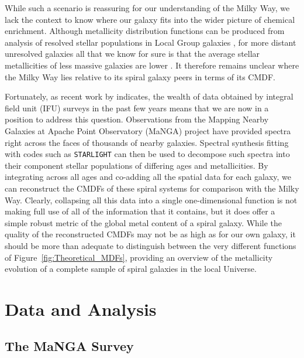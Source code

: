 \documentclass[fleqn,usenatbib]{mnras}
\begin{document}
While such a scenario is reassuring for our understanding of the Milky Way, we lack the context to know where our galaxy fits into the wider picture of chemical enrichment. Although metallicity distribution functions can be produced from analysis of resolved stellar populations in Local Group galaxies \citep[e.g.][]{Escala2018ModellingDiffusion, Manning2018FromGiants, Gilbert2019ElementalStream}, for more distant unresolved galaxies all that we know for sure is that the average stellar metallicities of less massive galaxies are lower \citep[e.g.][]{Gallazzi2005TheUniverse, Panter2008TheRecord}. It therefore remains unclear where the Milky Way lies relative to its spiral galaxy peers in terms of its CMDF.

Fortunately, as recent work by \citet{Mejia-Narvaez2020TheSurvey} indicates, the wealth of data obtained by integral field unit (IFU) surveys in the past few years means that we are now in a position to address this question. Observations from the Mapping Nearby Galaxies at Apache Point Observatory (MaNGA) project \citep{Bundy2015OVERVIEWOBSERVATORY} have provided spectra right across the faces of thousands of nearby galaxies. Spectral synthesis fitting with codes such as \texttt{STARLIGHT} \citep{CidFernandes2005Semi-empiricalMethod} can then be used to decompose such spectra into their component stellar populations of differing ages and metallicities. By integrating across all ages and co-adding all the spatial data for each galaxy, we can reconstruct the CMDFs of these spiral systems for comparison with the Milky Way. Clearly, collapsing all this data into a single one-dimensional function is not making full use of all of the information that it contains, but it does offer a simple robust metric of the global metal content of a spiral galaxy. While the quality of the reconstructed CMDFs may not be as high as for our own galaxy, it should be more than adequate to distinguish between the very different functions of Figure~\ref{fig:Theoretical_MDFs}, providing an overview of the metallicity evolution of a complete sample of spiral galaxies in the local Universe.


\section{Data and Analysis}
\label{sec:Observations}

\subsection{The MaNGA Survey}
\label{subsec:MaNGA}
\end{document}
